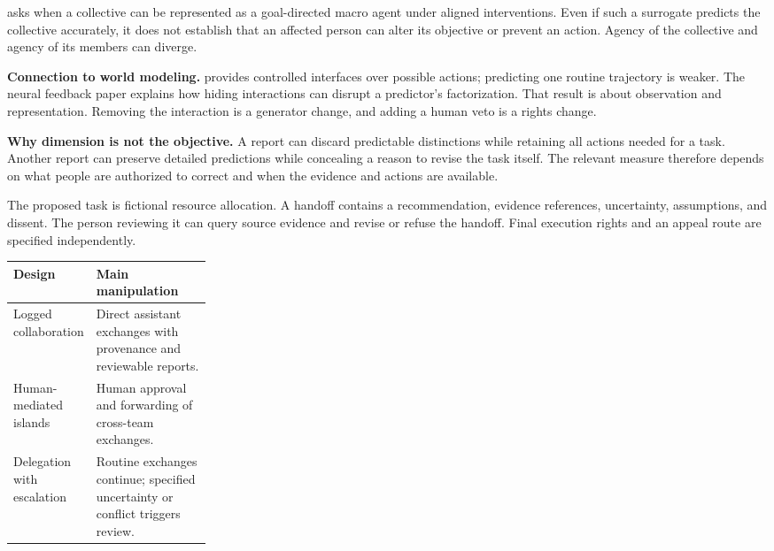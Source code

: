 \documentclass[11pt,letterpaper]{article}
\begin{document}
\citet{jorgensen2026collective} asks when a collective can be represented as a goal-directed macro agent under aligned interventions. Even if such a surrogate predicts the collective accurately, it does not establish that an affected person can alter its objective or prevent an action. Agency of the collective and agency of its members can diverge.

\textbf{Connection to world modeling.} \citet{rosas2025vat} provides controlled interfaces over possible actions; predicting one routine trajectory is weaker. The neural feedback paper \citep[PDF pp. 4--9, 24--25]{ehrlich2026feedback} explains how hiding interactions can disrupt a predictor's factorization. That result is about observation and representation. Removing the interaction is a generator change, and adding a human veto is a rights change.

\textbf{Why dimension is not the objective.} A report can discard predictable distinctions while retaining all actions needed for a task. Another report can preserve detailed predictions while concealing a reason to revise the task itself. The relevant measure therefore depends on what people are authorized to correct and when the evidence and actions are available.


The proposed task is fictional resource allocation. A handoff contains a recommendation, evidence references, uncertainty, assumptions, and dissent. The person reviewing it can query source evidence and revise or refuse the handoff. Final execution rights and an appeal route are specified independently.

\begin{tabularx}{\linewidth}{L{0.26\linewidth}Y}\toprule
Design & Main manipulation \\\midrule
Logged collaboration & Direct assistant exchanges with provenance and reviewable reports. \\
Human-mediated islands & Human approval and forwarding of cross-team exchanges. \\
Delegation with escalation & Routine exchanges continue; specified uncertainty or conflict triggers review. \\\bottomrule
\end{tabularx}
\end{document}
